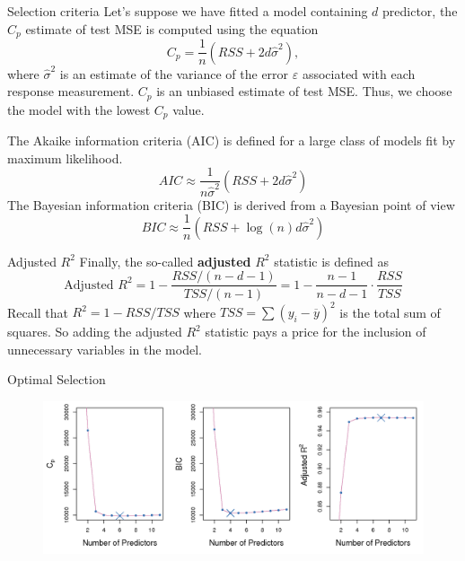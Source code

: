 \documentclass{beamer}
\begin{document}
\begin{frame}{Selection criteria}
	Let's suppose we have fitted a model containing $d$ predictor, the $C_p$ estimate of test MSE is computed using the equation
	\begin{equation*}
		C_p= \frac{1}{n} (RSS+ 2d \hat{\sigma}^2),
	\end{equation*}
	where $\hat{\sigma}^2$ is an estimate of the variance of the error $\varepsilon$ associated with each response measurement. $C_p$ is an unbiased estimate of test MSE. Thus, we choose the model with the lowest $C_p$ value. 
	
	The Akaike information criteria (AIC) is defined for a large class of models fit by maximum likelihood. 
	\begin{equation*}
		AIC \approx \frac{1}{n \hat{\sigma}^2} (RSS+ 2d \hat{\sigma}^2)
	\end{equation*}
 The Bayesian information criteria (BIC) is derived from a Bayesian point of view
 \begin{equation*}
 	BIC \approx \frac{1}{n} (RSS+ \log(n)d \hat{\sigma}^2)
 \end{equation*}

\end{frame}

\begin{frame}{Adjusted $R^2$}
	Finally, the so-called {\bf adjusted} $R^2$ statistic is defined as
	\begin{equation*}
		\textrm{Adjusted }R^2= 1 - \frac{RSS/(n-d-1)}{TSS/(n-1)}= 1 - \frac{n-1}{n-d-1} \cdot \frac{RSS}{TSS}
	\end{equation*}
Recall that $R^2= 1 - RSS/TSS$ where $TSS= \sum (y_i - \overline{y})^2$ is the total sum of squares. 
 So adding the adjusted $R^2$ statistic pays a price for the inclusion of unnecessary variables in the model. 

\end{frame}

\begin{frame}{Optimal Selection}
	
	
 \begin{figure}[h]
	\centering
	\includegraphics[scale=0.5]{../../Figures/fig_cp.png}
\end{figure}
\end{frame}
\end{document}
